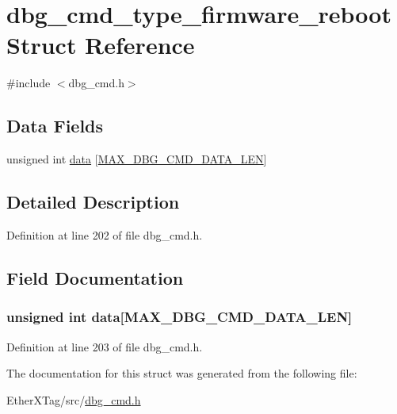 \hypertarget{structdbg__cmd__type__firmware__reboot}{\section{dbg\-\_\-cmd\-\_\-type\-\_\-firmware\-\_\-reboot Struct Reference}
\label{structdbg__cmd__type__firmware__reboot}
}


{\ttfamily \#include $<$dbg\-\_\-cmd.\-h$>$}

\subsection*{Data Fields}
\begin{DoxyCompactItemize}
\item 
unsigned int \hyperlink{structdbg__cmd__type__firmware__reboot_abf020699b43e0c558a6fdf56f12b92ec}{data} \mbox{[}\hyperlink{dbg__cmd_8h_a4552ec15033c8a68870cdf80eda5470c}{M\-A\-X\-\_\-\-D\-B\-G\-\_\-\-C\-M\-D\-\_\-\-D\-A\-T\-A\-\_\-\-L\-E\-N}\mbox{]}
\end{DoxyCompactItemize}


\subsection{Detailed Description}


Definition at line 202 of file dbg\-\_\-cmd.\-h.



\subsection{Field Documentation}
\hypertarget{structdbg__cmd__type__firmware__reboot_abf020699b43e0c558a6fdf56f12b92ec}{
\subsubsection[{data}]{\setlength{\rightskip}{0pt plus 5cm}unsigned int data\mbox{[}{\bf M\-A\-X\-\_\-\-D\-B\-G\-\_\-\-C\-M\-D\-\_\-\-D\-A\-T\-A\-\_\-\-L\-E\-N}\mbox{]}}}\label{structdbg__cmd__type__firmware__reboot_abf020699b43e0c558a6fdf56f12b92ec}


Definition at line 203 of file dbg\-\_\-cmd.\-h.



The documentation for this struct was generated from the following file\-:\begin{DoxyCompactItemize}
\item 
Ether\-X\-Tag/src/\hyperlink{dbg__cmd_8h}{dbg\-\_\-cmd.\-h}\end{DoxyCompactItemize}
